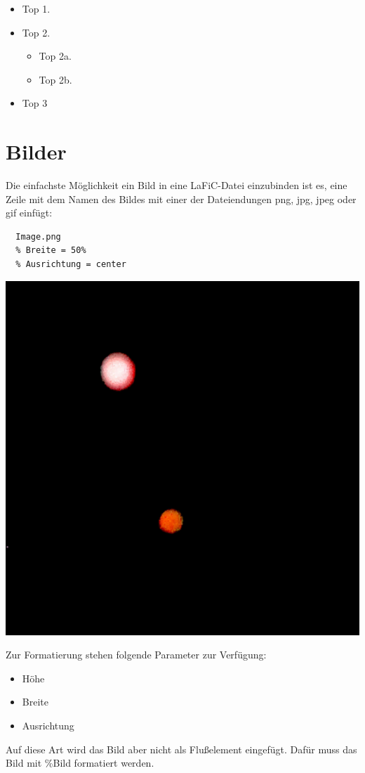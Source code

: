 \documentclass{scrartcl}
\begin{document}
\begin{itemize}
\item Top 1.
\item Top 2.
\begin{itemize}
\item Top 2a.
\item Top 2b.
\end{itemize}
\item Top 3
\end{itemize}


\section{Bilder}

{Die einfachste Möglichkeit ein Bild in eine LaFiC-Datei
einzubinden ist es, eine Zeile mit dem Namen des Bildes mit
einer der Dateiendungen png, jpg, jpeg oder gif einfügt:\\}

\begin{verbatim}
  Image.png
  % Breite = 50%
  % Ausrichtung = center
\end{verbatim}


{\centering\includegraphics[width=.50\linewidth]{Image.png}\\}

{Zur Formatierung stehen folgende Parameter zur Verfügung:\\}

\begin{itemize}
\item Höhe
\item Breite
\item Ausrichtung
\end{itemize}


{Auf diese Art wird das Bild aber nicht als Flußelement
eingefügt. Dafür muss das Bild mit  \%Bild formatiert
werden.\\}
\end{document}
